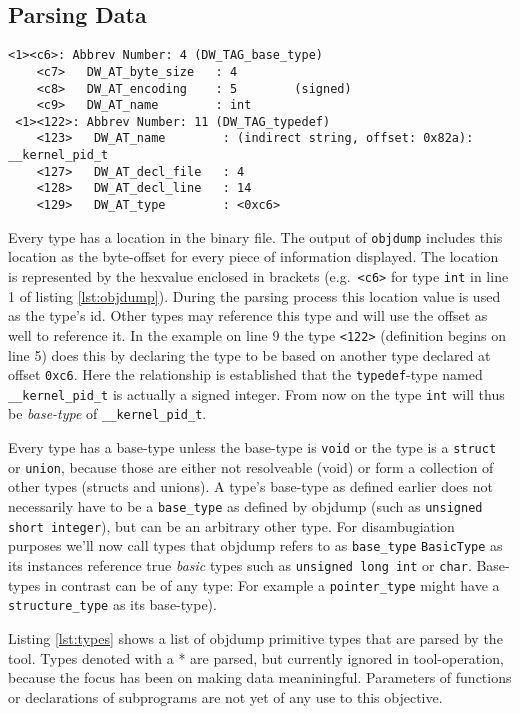 \subsection{Parsing Data}
\begin{lstlisting}[frame=single,caption=A typical objdump structure,label=lst:objdump]
 <1><c6>: Abbrev Number: 4 (DW_TAG_base_type)
    <c7>   DW_AT_byte_size   : 4
    <c8>   DW_AT_encoding    : 5        (signed)
    <c9>   DW_AT_name        : int
 <1><122>: Abbrev Number: 11 (DW_TAG_typedef)
    <123>   DW_AT_name        : (indirect string, offset: 0x82a): __kernel_pid_t
    <127>   DW_AT_decl_file   : 4
    <128>   DW_AT_decl_line   : 14
    <129>   DW_AT_type        : <0xc6>
\end{lstlisting}
Every type has a location in the binary file.
The output of \texttt{objdump} includes this location as the byte-offset for every piece of information displayed.
The location is represented by the hexvalue enclosed in brackets (e.g.~\texttt{<c6>} for type \texttt{int} in line 1 of listing \ref{lst:objdump}).
During the parsing process this location value is used as the type’s id.
Other types may reference this type and will use the offset as well to reference it.
In the example on line 9 the type \texttt{<122>} (definition begins on line 5) does this by declaring the type to be based on another type declared at offset \texttt{0xc6}.
Here the relationship is established that the \texttt{typedef}-type named \texttt{\_\_kernel\_pid\_t} is actually a signed integer.
From now on the type \texttt{int} will thus be \emph{base-type} of \texttt{\_\_kernel\_pid\_t}.

Every type has a base-type unless the base-type is \texttt{void} or the type is a \texttt{struct} or \texttt{union}, because those are either not resolveable (void) or form a collection of other types (structs and unions).
A type’s base-type as defined earlier does not necessarily have to be a \texttt{base\_type} as defined by objdump (such as \texttt{unsigned short integer}), but can be an arbitrary other type.
For disambugiation purposes we’ll now call types that objdump refers to as \texttt{base\_type} \texttt{BasicType} as its instances reference true \emph{basic} types such as \texttt{unsigned long int} or \texttt{char}.
Base-types in contrast can be of any type: 
For example a \texttt{pointer\_type} might have a \texttt{structure\_type} as its base-type).

Listing \ref{lst:types} shows a list of objdump primitive types that are parsed by the tool.
Types denoted with a * are parsed, but currently ignored in tool-operation, because the focus has been on making data meaniningful.
Parameters of functions or declarations of subprograms are not yet of any use to this objective.

